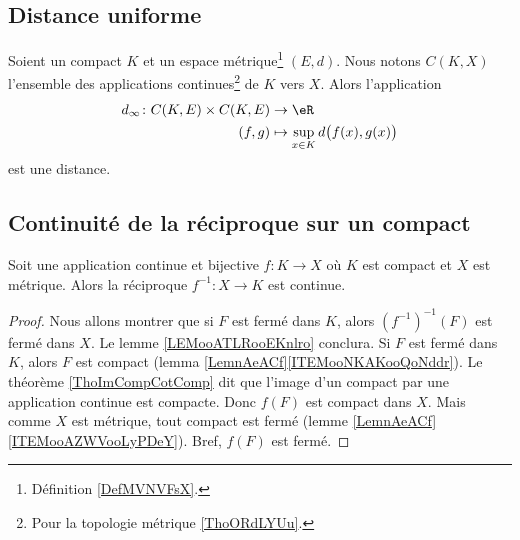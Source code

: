 \subsection{Distance uniforme}

\begin{proposition}	\label{PROPooNSCCooJuqOQe}
	Soient un compact \( K\) et un espace métrique\footnote{Définition \ref{DefMVNVFsX}.} \( (E,d)\). Nous notons \( C(K,X)\) l'ensemble des applications continues\footnote{Pour la topologie métrique \ref{ThoORdLYUu}.} de \( K\) vers \( X\). Alors l'application
	\begin{equation}
		\begin{aligned}
			d_{\infty}\colon C(K,E)\times C(K,E) & \to \eR                                     \\
			(f,g)                                & \mapsto \sup_{x\in K}d\big( f(x),g(x) \big)
		\end{aligned}
	\end{equation}
	est une distance.
\end{proposition}


\subsection{Continuité de la réciproque sur un compact}


\begin{lemma}     \label{LEMooPLGTooATIGov}
	Soit une application continue et bijective \( f\colon K\to X \) où \( K\) est compact et \( X\) est métrique. Alors la réciproque \(f^{-1}\colon X\to K\) est continue.
\end{lemma}

\begin{proof}
	Nous allons montrer que si \( F\) est fermé dans \( K\), alors \( (f^{-1})^{-1}(F)\) est fermé dans \( X\). Le lemme \ref{LEMooATLRooEKnlro} conclura. Si \( F\) est fermé dans \( K\), alors \( F\) est compact (lemma \ref{LemnAeACf}\ref{ITEMooNKAKooQoNddr}). Le théorème \ref{ThoImCompCotComp} dit que l'image d'un compact par une application continue est compacte. Donc \( f(F)\) est compact dans \( X\). Mais comme \( X\) est métrique, tout compact est fermé (lemme \ref{LemnAeACf}\ref{ITEMooAZWVooLyPDeY}). Bref, \( f(F)\) est fermé.
\end{proof}


